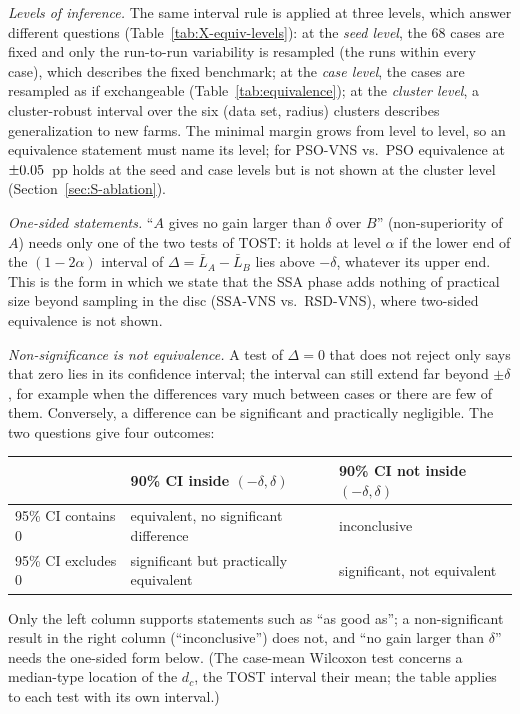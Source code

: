 \emph{Levels of inference.} The same interval rule is applied at three levels, which answer different questions (Table~\ref{tab:X-equiv-levels}): at the \emph{seed level}, the 68 cases are fixed and only the run-to-run variability is resampled (the runs within every case), which describes the fixed benchmark; at the \emph{case level}, the cases are resampled as if exchangeable (Table~\ref{tab:equivalence}); at the \emph{cluster level}, a cluster-robust interval over the six (data set, radius) clusters describes generalization to new farms. The minimal margin grows from level to level, so an equivalence statement must name its level; for PSO-VNS vs.\ PSO equivalence at $\pm0.05$~pp holds at the seed and case levels but is not shown at the cluster level (Section~\ref{sec:S-ablation}).

\emph{One-sided statements.} ``$A$ gives no gain larger than $\delta$ over $B$'' (non-superiority of $A$) needs only one of the two tests of TOST: it holds at level $\alpha$ if the lower end of the $(1-2\alpha)$ interval of $\Delta=\bar L_A-\bar L_B$ lies above $-\delta$, whatever its upper end. This is the form in which we state that the SSA phase adds nothing of practical size beyond sampling in the disc (SSA-VNS vs.\ RSD-VNS), where two-sided equivalence is not shown.

\emph{Non-significance is not equivalence.} A test of $\Delta=0$ that does not reject only says that zero lies in its confidence interval; the interval can still extend far beyond $\pm\delta$, for example when the differences vary much between cases or there are few of them. Conversely, a difference can be significant and practically negligible. The two questions give four outcomes:

\begin{center}
\small
\begin{tabular}{lll}
\toprule
& 90\% CI inside $(-\delta,\delta)$ & 90\% CI not inside $(-\delta,\delta)$\\
\midrule
95\% CI contains 0 & equivalent, no significant difference & inconclusive\\
95\% CI excludes 0 & significant but practically equivalent & significant, not equivalent\\
\bottomrule
\end{tabular}
\end{center}
Only the left column supports statements such as ``as good as''; a non-significant result in the right column (``inconclusive'') does not, and ``no gain larger than $\delta$'' needs the one-sided form below. (The case-mean Wilcoxon test concerns a median-type location of the $d_c$, the TOST interval their mean; the table applies to each test with its own interval.)

